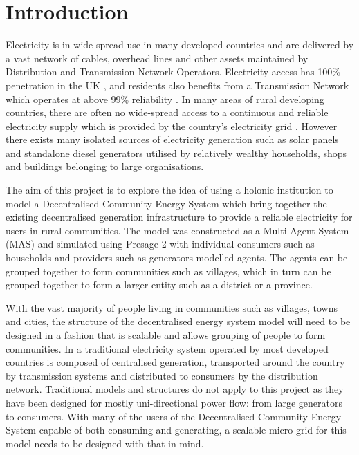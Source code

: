 \chapter{Introduction}
\label{introduction}

Electricity is in wide-spread use in many developed countries and are delivered by a vast network of cables, overhead lines and other assets maintained by Distribution and Transmission Network Operators. Electricity access has 100\% penetration in the UK \cite{World-Bank-web:2015}, and residents also benefits from a Transmission Network which operates at above 99\% reliability \cite{NG-web:2015}. In many areas of rural developing countries, there are often no wide-spread access to a continuous and reliable electricity supply which is provided by the country's electricity grid \cite{IEA-web:2015}. However there exists many isolated sources of electricity generation such as solar panels and standalone diesel generators utilised by relatively wealthy households, shops and buildings belonging to large organisations. 

The aim of this project is to explore the idea of using a holonic institution to model a Decentralised Community Energy System which bring together the existing decentralised generation infrastructure to provide a reliable electricity for users in rural communities. The model was constructed as a Multi-Agent System (MAS) and simulated using Presage 2 with individual consumers such as households and providers such as generators modelled agents. The agents can be grouped together to form communities such as villages, which in turn can be grouped together to form a larger entity such as a district or a province. 

With the vast majority of people living in communities such as villages, towns and cities, the structure of the decentralised energy system model will need to be designed in a fashion that is scalable and allows grouping of people to form communities. In a traditional electricity system operated by most developed countries is composed of centralised generation, transported around the country by transmission systems and distributed to consumers by the distribution network. Traditional models and structures do not apply to this project as they have been designed for mostly uni-directional power flow: from large generators to consumers. With many of the users of the Decentralised Community Energy System capable of both consuming and generating, a scalable micro-grid for this model needs to be designed with that in mind.

